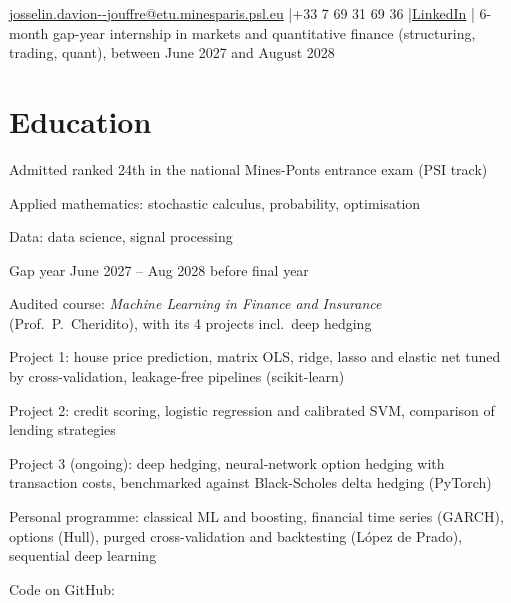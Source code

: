 
\renewcommand{\lignesep}{:}
  {\href{mailto:josselin.davion--jouffre@etu.minesparis.psl.eu}{josselin.davion{-}{-}jouffre@etu.minesparis.psl.eu} \enspace|\enspace +33 7 69 31 69 36 \enspace|\enspace \href{https://www.linkedin.com/in/josselin-jouffre-8a12043a3}{LinkedIn} \enspace|\enspace {}}
  {6-month gap-year internship in markets and quantitative finance (structuring, trading, quant), between June 2027 and August 2028}

\section{Education}

\begin{points}
  \item Admitted ranked 24th in the national Mines-Ponts entrance exam (PSI track)
  \item Applied mathematics: stochastic calculus, probability, optimisation
  \item Data: data science, signal processing
  \item Gap year June 2027 -- Aug 2028 before final year
\end{points}

\begin{points}
  \item Audited course: \textit{Machine Learning in Finance and Insurance} (Prof.\ P.\ Cheridito), with its 4 projects incl.\ deep hedging
  \item Project 1: house price prediction, matrix OLS, ridge, lasso and elastic net tuned by cross-validation, leakage-free pipelines (scikit-learn)
  \item Project 2: credit scoring, logistic regression and calibrated SVM, comparison of lending strategies
  \item Project 3 (ongoing): deep hedging, neural-network option hedging with transaction costs, benchmarked against Black-Scholes delta hedging (PyTorch)
  \item Personal programme: classical ML and boosting, financial time series (GARCH), options (Hull), purged cross-validation and backtesting (López de Prado), sequential deep learning
  \item Code on GitHub: 
\end{points}

